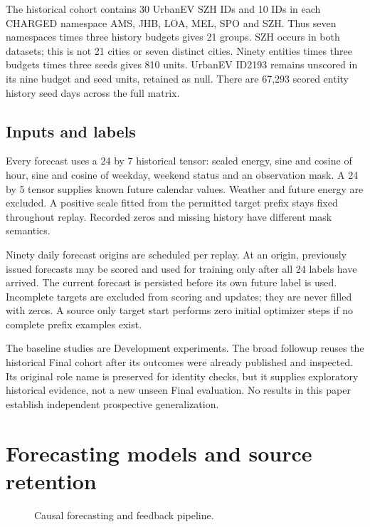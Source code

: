 \documentclass[pdflatex,iicol,sn-mathphys-num]{sn-jnl}
\begin{document}
The historical cohort contains 30 UrbanEV SZH IDs and 10 IDs in each CHARGED namespace AMS, JHB, LOA, MEL, SPO and SZH. Thus seven namespaces times three history budgets gives 21 groups. SZH occurs in both datasets; this is not 21 cities or seven distinct cities. Ninety entities times three budgets times three seeds gives 810 units. UrbanEV ID2193 remains unscored in its nine budget and seed units, retained as null. There are 67,293 scored entity history seed days across the full matrix.

\subsection{Inputs and labels}

Every forecast uses a 24 by 7 historical tensor: scaled energy, sine and cosine of hour, sine and cosine of weekday, weekend status and an observation mask. A 24 by 5 tensor supplies known future calendar values. Weather and future energy are excluded. A positive scale fitted from the permitted target prefix stays fixed throughout replay. Recorded zeros and missing history have different mask semantics.

Ninety daily forecast origins are scheduled per replay. At an origin, previously issued forecasts may be scored and used for training only after all 24 labels have arrived. The current forecast is persisted before its own future label is used. Incomplete targets are excluded from scoring and updates; they are never filled with zeros. A source only target start performs zero initial optimizer steps if no complete prefix examples exist.

The baseline studies are Development experiments. The broad followup reuses the historical Final cohort after its outcomes were already published and inspected. Its original role name is preserved for identity checks, but it supplies exploratory historical evidence, not a new unseen Final evaluation. No results in this paper establish independent prospective generalization.


\section{Forecasting models and source retention}

\begin{figure}[t]
\centering
\resizebox{\textwidth}{!}{}
\caption{Causal forecasting and feedback pipeline.}\label{fig:pipeline}
\end{figure}
\end{document}
